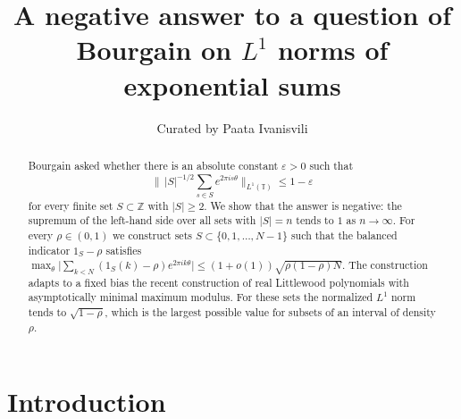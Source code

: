 \documentclass[11pt,reqno]{amsart}
\theoremstyle{definition}
\begin{document}
\title[A negative answer to a question of Bourgain]{A negative answer to a question of Bourgain on $L^1$ norms of exponential sums}

\DeclareRobustCommand{\curatedline}{Curated by Paata Ivanisvili}
\author[Paata Ivanisvili]{\curatedline}
\address{Department of Mathematics, University of California, Irvine, CA 92697, USA}


\begin{abstract}
Bourgain asked whether there is an absolute constant $\varepsilon>0$ such that
\[
\Big\|\,|S|^{-1/2}\sum_{s\in S}e^{2\pi is\theta}\Big\|_{L^1(\mathbb T)}\le1-\varepsilon
\]
for every finite set $S\subset\mathbb Z$ with $|S|\ge2$. We show that the answer is negative: the supremum of the left-hand side over all sets with $|S|=n$ tends to $1$ as $n\to\infty$. For every $\rho\in(0,1)$ we construct sets $S\subset\{0,1,\dots,N-1\}$ such that the balanced indicator $1_S-\rho$ satisfies $\max_\theta\big|\sum_{k<N}(1_S(k)-\rho)e^{2\pi ik\theta}\big|\le(1+o(1))\sqrt{\rho(1-\rho)N}$. The construction adapts to a fixed bias the recent construction of real Littlewood polynomials with asymptotically minimal maximum modulus. For these sets the normalized $L^1$ norm tends to $\sqrt{1-\rho}$, which is the largest possible value for subsets of an interval of density $\rho$.
\end{abstract}

\maketitle

\section{Introduction}
\end{document}
